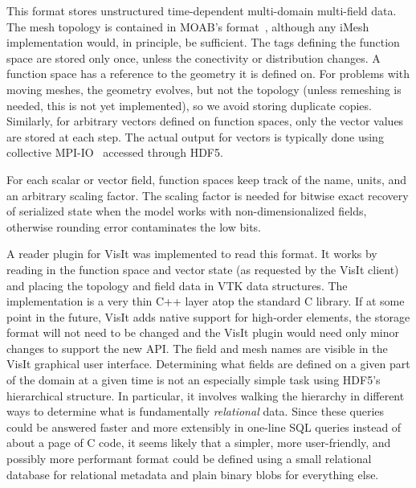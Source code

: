 This format stores unstructured time-dependent multi-domain multi-field data.
The mesh topology is contained in MOAB's format~\cite{moab}, although any iMesh implementation would, in principle, be sufficient.
The tags defining the function space are stored only once, unless the conectivity or distribution changes.
A function space has a reference to the geometry it is defined on.
For problems with moving meshes, the geometry evolves, but not the topology (unless remeshing is needed, this is not yet implemented), so we avoid storing duplicate copies.
Similarly, for arbitrary vectors defined on function spaces, only the vector values are stored at each step.
The actual output for vectors is typically done using collective MPI-IO~\cite{corbett1995overview} accessed through HDF5.

For each scalar or vector field, function spaces keep track of the name, units, and an arbitrary scaling factor.
The scaling factor is needed for bitwise exact recovery of serialized state when the model works with non-dimensionalized fields, otherwise rounding error contaminates the low bits.

A reader plugin for VisIt was implemented to read this format.
It works by reading in the function space and vector state (as requested by the VisIt client) and placing the topology and field data in VTK data structures.
The implementation is a very thin C++ layer atop the standard C library.
If at some point in the future, VisIt adds native support for high-order elements, the storage format will not need to be changed and the VisIt plugin would need only minor changes to support the new API.
The field and mesh names are visible in the VisIt graphical user interface.
Determining what fields are defined on a given part of the domain at a given time is not an especially simple task using HDF5's hierarchical structure.
In particular, it involves walking the hierarchy in different ways to determine what is fundamentally \emph{relational} data.
Since these queries could be answered faster and more extensibly in one-line SQL queries instead of about a page of C code, it seems likely that a simpler, more user-friendly, and possibly more performant format could be defined using a small relational database for relational metadata and plain binary blobs for everything else.
